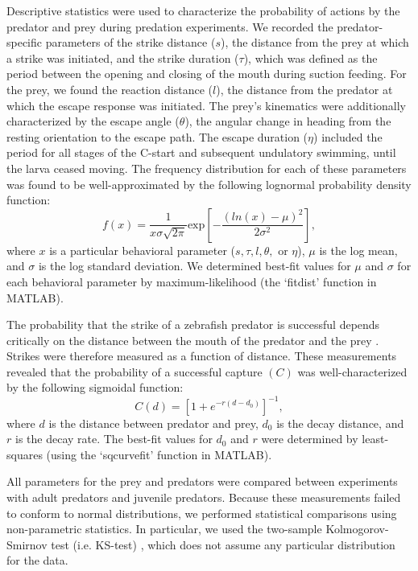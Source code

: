 \documentclass[]{rsos}%
\begin{document}
Descriptive statistics were used to characterize the probability of actions by the predator and prey during predation experiments.
We recorded the predator-specific parameters of the strike distance ($s$), the distance from the prey at which a strike was initiated, and the strike duration ($\tau$), which was defined as the period between the opening and closing of the mouth during suction feeding. 
For the prey, we found the reaction distance ($l$), the distance from the predator at which the escape response was initiated.
The prey's kinematics were additionally characterized by the escape angle ($\theta$), the angular change in heading from the resting orientation to the escape path.
The escape duration ($\eta$) included the period for all stages of the C-start and subsequent undulatory swimming, until the larva ceased moving.
The frequency distribution for each of these parameters was found to be well-approximated by the following lognormal probability density function:
%
\begin{equation}%
f(x) = \frac{1}{x\sigma \sqrt{2 \pi}} \text{exp} \left[ -{\frac{(ln(x)-\mu)^2}{2\sigma ^2}} \right],
\label{eqn_lognorm}
\end{equation}
%
where $x$ is a particular behavioral parameter ($s, \tau, l, \theta ,$ or $\eta$), $\mu$ is the log mean, and $\sigma$ is the log standard deviation. 
We determined best-fit values for $\mu$ and $\sigma$ for each behavioral parameter by maximum-likelihood (the `fitdist' function in MATLAB).

The probability that the strike of a zebrafish predator is successful depends critically on the distance between the mouth of the predator and the prey \cite{Stewart:2013bha}.
Strikes were therefore measured as a function of distance. 
These measurements revealed that the probability of a successful capture $(C)$ was well-characterized by the following sigmoidal function:
%
\begin{equation}%
C(d) = \left[ 1+e^{-r(d-d_0)} \right]^{-1},
\label{eqn_sig} 
\end{equation}
%
where $d$ is the distance between predator and prey, $d_0$ is the decay distance, and $r$ is the decay rate. 
The best-fit values for $d_0$ and $r$ were determined by least-squares (using the `sqcurvefit' function in MATLAB).

All parameters for the prey and predators were compared between experiments with adult predators and juvenile predators.
Because these measurements failed to conform to normal distributions, we performed statistical comparisons using non-parametric statistics.
In particular, we used the two-sample Kolmogorov-Smirnov test (i.e. KS-test) \cite{MasseyJr:1951jo}, which does not assume any particular distribution for the data. 
\end{document}
